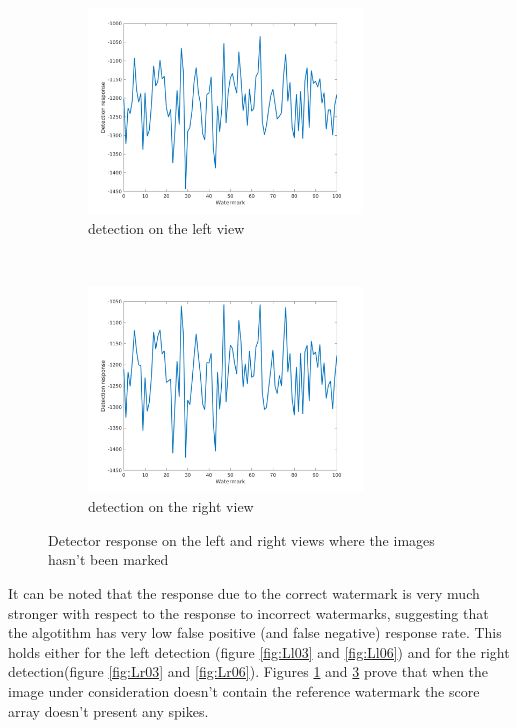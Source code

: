 \begin{figure}[h!]
    \centering
    \begin{subfigure}[t]{0.5\textwidth}
        \centering
\includegraphics[width=0.8\textwidth]{./img/likelihood/correct_LikelihoodL_NM.png}
          \caption{\small{detection on the left view}}
\label{fig:Llnm}

    \end{subfigure}%
    ~ 
    \begin{subfigure}[t]{0.5\textwidth}
        \centering
\includegraphics[width=0.8\textwidth]{./img/likelihood/correct_LikelihoodLr_NM.png}
           \caption{\small{detection on the right view}}
\label{fig:Lrnm}
    \end{subfigure}
    \caption{Detector response on the left and right views where the images hasn't been marked}
\end{figure}


\clearpage
It can be noted that the response due to the correct watermark is very much stronger with respect to the response to incorrect watermarks, suggesting that the algotithm has very low false positive (and false negative) response rate. This holds either for the left detection (figure \ref{fig:Ll03} and \ref{fig:Ll06}) and for the right detection(figure \ref{fig:Lr03} and \ref{fig:Lr06}). \newline Figures \ref{fig:Llnm} and  \ref{fig:Lrnm} prove that when the image under consideration doesn't contain the reference watermark the score array doesn't present any spikes.

